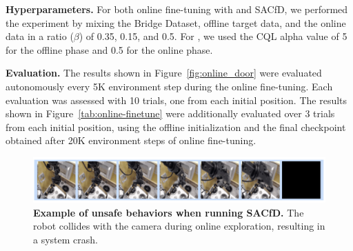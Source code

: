 \documentclass[../thesis.tex]{subfiles}
\begin{document}
\textbf{Hyperparameters.} 
For both online fine-tuning with \ptrmethodname and SACfD, we performed the experiment by mixing the Bridge Dataset, offline target data, and the online data in a ratio ($\beta$) of 0.35, 0.15, and 0.5. For \ptrmethodname, we used the CQL alpha value of 5 for the offline phase and 0.5 for the online phase. 

\textbf{Evaluation.} The results shown in Figure~\ref{fig:online_door} were evaluated autonomously every 5K environment step during the online fine-tuning. Each evaluation was assessed with 10 trials, one from each initial position. The results shown in Figure~\ref{tab:online-finetune} were additionally evaluated over 3 trials from each initial position, using the offline initialization and the final checkpoint obtained after 20K environment steps of online fine-tuning.

\begin{figure}
\includegraphics[width=\linewidth]{chapters/ptr/dangerous_actions.jpeg}
\caption{\footnotesize{\label{fig:dangerous-actions} \textbf{Example of unsafe behaviors when running SACfD.} The robot collides with the camera during online exploration, resulting in a system crash.}}
\end{figure}
\end{document}
